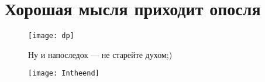 \section*{Хорошая мысля приходит опосля}
\begin{figure}[ht!] %
    \centering
    \texttt{[image: dp]}
    \caption{Ну и напоследок --- не старейте духом;)}
\end{figure}
\begin{figure}[ht!]
    \centering
    \vspace*{-1.7cm}\hspace*{-3.2cm}
    \texttt{[image: Intheend]}
\end{figure}

